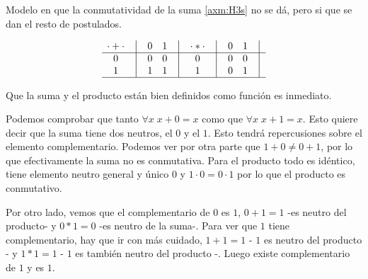 	Modelo en que la conmutatividad de la suma \ref{axm:H3s} no se dá, pero
si que se dan el resto de postulados.



\begin{equation}
    \begin{matrix}
        {\cdot + \cdot} & \big{\vert} & {0} & {1} & \big{\vert} \\
        \hline
        {0}             & \big{\vert} & {0} & {0} & \big{\vert} \\
        {1}             & \big{\vert} & {1} & {1} & \big{\vert} \\
        \hline
    \end{matrix}
    \quad
    \begin{matrix}
        {\cdot * \cdot} & \big{\vert} & {0} & {1} & \big{\vert} \\
        \hline
        {0}                   & \big{\vert} & {0} & {0} & \big{\vert} \\
        {1}                   & \big{\vert} & {0} & {1} & \big{\vert} \\
        \hline
    \end{matrix}
\end{equation}



	Que la suma y el producto están bien definidos como función es inmediato.



	Podemos comprobar que tanto \(\forall x \; x + 0 = x\) como que \(\forall
x \; x + 1 = x\). Esto quiere decir que la suma tiene dos neutros, el \(0\) y
el \(1\). Esto tendrá repercusiones sobre el elemento complementario. Podemos
ver por otra parte que \(1 + 0 \neq 0 + 1\), por lo que efectivamente la suma
no es conmutativa. Para el producto todo es idéntico, tiene elemento neutro
general y único \(0\) y \(1\cdot 0 = 0\cdot 1\) por lo que el producto es
conmutativo.



	Por otro lado, vemos que el complementario de \(0\) es \(1\), \(0 + 1 =
1\) -es neutro del producto- y \(0 * 1 = 0\) -es neutro de la suma-. Para ver
que \(1\) tiene complementario, hay que ir con más cuidado, \(1 + 1 = 1\) -
\(1\) es neutro del producto - y \(1 * 1 = 1\) - \(1\) es también neutro del
producto -. Luego existe complementario de \(1\) y es \(1\).



